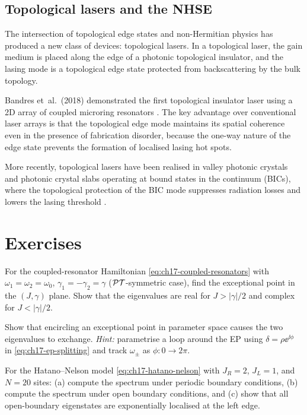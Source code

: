 \subsection{Topological lasers and the NHSE}
\label{sec:ch17-topo-laser}

The intersection of topological edge states and non-Hermitian physics
has produced a new class of devices: topological lasers.  In a
topological laser, the gain medium is placed along the edge of a
photonic topological insulator, and the lasing mode is a topological
edge state protected from backscattering by the bulk topology.

Bandres et~al.\ (2018) demonstrated the first topological insulator
laser using a 2D array of coupled microring resonators
\cite{bandres2018topologicalb,harari2018topological}.  The key
advantage over conventional laser arrays is that the topological
edge mode maintains its spatial coherence even in the presence of
fabrication disorder, because the one-way nature of the edge state
prevents the formation of localised lasing hot spots.

More recently, topological lasers have been realised in valley
photonic crystals \cite{zhu2026topology} and photonic crystal slabs
operating at bound states in the continuum (BICs), where the
topological protection of the BIC mode suppresses radiation losses
and lowers the lasing threshold
\cite{price2022roadmap}.

\section*{Exercises}

\begin{exercise}
  For the coupled-resonator Hamiltonian \eqref{eq:ch17-coupled-resonators}
  with $\omega_1=\omega_2=\omega_0$, $\gamma_1=-\gamma_2=\gamma$
  ($\mathcal{PT}$-symmetric case), find the exceptional point in the $(J,\gamma)$
  plane.  Show that the eigenvalues are real for $J>|\gamma|/2$ and
  complex for $J<|\gamma|/2$.
\end{exercise}

\begin{exercise}
  Show that encircling an exceptional point in parameter space causes
  the two eigenvalues to exchange.  \emph{Hint:} parametrise a loop
  around the EP using $\delta=\rho\ee^{\ii\phi}$ in
  \eqref{eq:ch17-ep-splitting} and track $\omega_\pm$ as
  $\phi:0\to 2\pi$.
\end{exercise}

\begin{exercise}
  For the Hatano--Nelson model \eqref{eq:ch17-hatano-nelson} with
  $J_R=2$, $J_L=1$, and $N=20$ sites: (a) compute the spectrum under
  periodic boundary conditions, (b) compute the spectrum under open
  boundary conditions, and (c) show that all open-boundary eigenstates
  are exponentially localised at the left edge.
\end{exercise}

